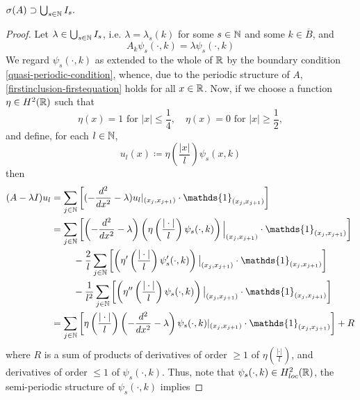 \begin{theorem} \label{4.1:thm-MainResult.FirstInclusion}
	$\sigma(A) \supset \bigcup_{s \in \mathbb{N}} I_{s}.$
	
	\begin{proof}
		Let $\lambda \in \bigcup_{s \in \mathbb{N}} I_{s}$, i.e. $\lambda = \lambda_{s}(k)$ for some $s \in \mathbb{N}$ and some $k \in \overline{B}$, and 
		\begin{equation}
			A_{k} \psi_{s}(\cdot, k) = \lambda \psi_{s}(\cdot, k) \label{firstinclusion-firstequation} %
		\end{equation}
		We regard $\psi_{s}(\cdot, k)$ as extended to the whole of $\mathbb{R}$ by the boundary condition \eqref{quasi-periodic-condition}, whence, due to the periodic structure of $A$, \eqref{firstinclusion-firstequation} holds for all $x \in \mathbb{R}$. Now, if we choose a function $\eta \in H^{2}(\mathbb{R})$ such that
			\[ \eta(x) = 1 \text{ for } |x| \leq \frac{1}{4}, \quad \eta(x) = 0 \text{ for } |x| \geq \frac{1}{2}, \]
		and define, for each $l \in \mathbb{N}$,
			\[ u_{l}(x) \coloneqq \eta\left(\frac{|x|}{l}\right) \psi_{s}(x, k) \]
	 	then
		\begin{align}
			(A - \lambda I) u_{l} & = \sum_{j \in \N} \left[ (- \frac{d^{2}}{dx^{2}} - \lambda) u_{l}|_{(x_{j}, x_{j+1})} \cdot \mathds{1}_{(x_{j}, x_{j+1})} \right] \label{eq:sepofspectraleq} \\
				& = \sum_{j \in \N} \left[ \left(- \frac{d^{2}}{dx^{2}} - \lambda \right) \left( \eta\left(\frac{|\cdot|}{l}\right) \psi_{s}(\cdot, k) \right)\Big|_{(x_{j}, x_{j+1})} \cdot \mathds{1}_{(x_{j}, x_{j+1})} \right] \notag \\
				& ~\qquad - \frac{2}{l} \sum_{j \in \N} \left[ \left( \eta'\left(\frac{|\cdot|}{l}\right) \psi_{s}'(\cdot, k) \right)\big|_{(x_{j}, x_{j+1})} \cdot \mathds{1}_{(x_{j}, x_{j+1})}  \right] \notag \\
				& ~\qquad - \frac{1}{l^{2}} \sum_{j \in \N} \left[ \left( \eta''\left(\frac{|\cdot|}{l}\right) \psi_{s}(\cdot, k) \right)\big|_{(x_{j}, x_{j+1})} \cdot \mathds{1}_{(x_{j}, x_{j+1})} \right] \notag \\
				& = \sum_{j \in \N} \left[ \eta\left(\frac{|\cdot|}{l}\right) \left(- \frac{d^{2}}{dx^{2}} - \lambda \right) \psi_{s}(\cdot, k) |_{(x_{j}, x_{j+1})} \cdot \mathds{1}_{(x_{j}, x_{j+1})} \right] + R \notag
		\end{align}
		where $R$ is a sum of products of derivatives of order $\geq 1$ of $\eta\left(\frac{|\cdot|}{l}\right)$, and derivatives of order $\leq 1$ of $\psi_{s}(\cdot, k)$. Thus, note that $\psi_{s}(\cdot, k) \in H^{2}_{loc}(\mathbb{R})$, the semi-periodic structure of $\psi_{s}(\cdot, k)$ implies

\end{proof}
\end{theorem}
